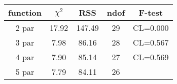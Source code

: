 \begin{tabular}{c|c|c|c|c}
function & $\chi^2$ & RSS & ndof & F-test \\
\hline
2 par & 17.92 & 147.49 & 29 & CL=0.000 \\
3 par & 7.98 & 86.16 & 28 & CL=0.567 \\
4 par & 7.90 & 85.14 & 27 & CL=0.569 \\
5 par & 7.79 & 84.11 & 26 & \\
\hline
\end{tabular}